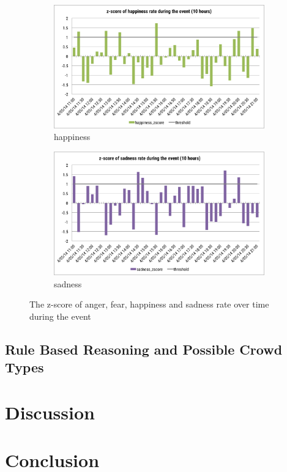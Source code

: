 \begin{figure}[htb!]
\begin{subfigure}{0.5\textwidth}
\centering    
\includegraphics[width=0.99\linewidth]{HappinessZscoreEvent}
\caption{happiness}
\label{fig:happinessZscoreEvent}
\end{subfigure}%
\begin{subfigure}{0.5\textwidth}
\centering    
\includegraphics[width=0.99\linewidth]{SadnessZscoreEvent}
\caption{sadness}
\label{fig:sadnessZscoreEvent}
\end{subfigure}
\caption{The z-score of anger, fear, happiness and sadness rate over time during the event}
\end{figure}

\subsection{Rule Based Reasoning and Possible Crowd Types}

\section{Discussion}

\section{Conclusion}